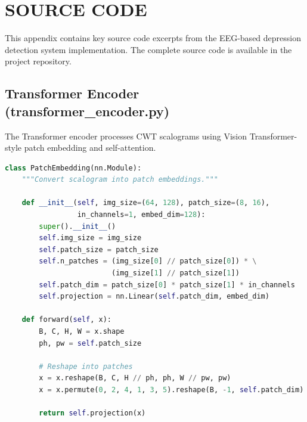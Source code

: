
\chapter{SOURCE CODE}

This appendix contains key source code excerpts from the EEG-based depression detection system implementation. The complete source code is available in the project repository.

\section{Transformer Encoder (transformer\_encoder.py)}

The Transformer encoder processes CWT scalograms using Vision Transformer-style patch embedding and self-attention.

\begin{lstlisting}[language=Python, caption={Patch Embedding Module}]
class PatchEmbedding(nn.Module):
    """Convert scalogram into patch embeddings."""

    def __init__(self, img_size=(64, 128), patch_size=(8, 16),
                 in_channels=1, embed_dim=128):
        super().__init__()
        self.img_size = img_size
        self.patch_size = patch_size
        self.n_patches = (img_size[0] // patch_size[0]) * \
                         (img_size[1] // patch_size[1])
        self.patch_dim = patch_size[0] * patch_size[1] * in_channels
        self.projection = nn.Linear(self.patch_dim, embed_dim)

    def forward(self, x):
        B, C, H, W = x.shape
        ph, pw = self.patch_size

        # Reshape into patches
        x = x.reshape(B, C, H // ph, ph, W // pw, pw)
        x = x.permute(0, 2, 4, 1, 3, 5).reshape(B, -1, self.patch_dim)

        return self.projection(x)
\end{lstlisting}

